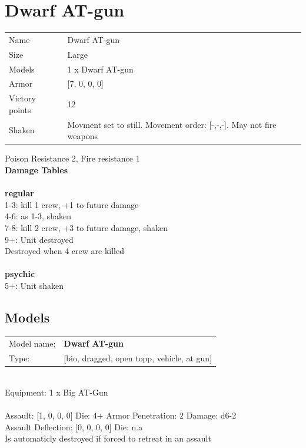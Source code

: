 \clearpage

\section{ Dwarf AT-gun }

\begin{tabular}{ll}
  Name & Dwarf AT-gun \\
  Size & Large\\
  Models & 1 x Dwarf AT-gun\\
  Armor & [7, 0, 0, 0]\\
  Victory points & 12\\
  Shaken & Movment set to still. Movement order: [-,-,-]. May not fire weapons\\
\end{tabular}

Poison Resistance 2, Fire resistance 1\\ 



{\bf Damage Tables} \\
\ \\ {\bf regular } \\
1-3: kill 1 crew, +1 to future damage \\
4-6: as 1-3, shaken \\
7-8: kill 2 crew, +3 to future damage, shaken \\
9+: Unit destroyed \\
Destroyed when 4 crew are killed \\
\ \\ {\bf psychic } \\
5+: Unit shaken \\


\clearpage

\subsection{ Models }

\begin{tabular}{ll}
Model name: & {\bf Dwarf AT-gun } \\
Type: & [bio, dragged, open topp, vehicle, at gun] \\
\end{tabular}
\ \\
Equipment: 1 x Big AT-Gun \\
\ \\
Assault: [1, 0, 0, 0] Die: 4+ Armor Penetration: 2 Damage: d6-2 \\
Assault Deflection: [0, 0, 0, 0] Die: n.a\\
\indent Is automaticly destroyed if forced to retreat in an assault\\ 
 
